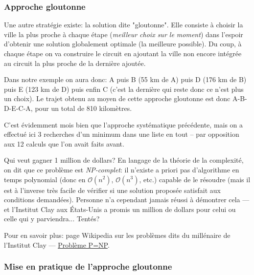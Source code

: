 \documentclass[12pt]{article}
\begin{document}
	\subsubsection*{Approche gloutonne}	
	Une autre stratégie existe: la solution dite "gloutonne". Elle consiste à choisir la ville la plus proche à chaque étape (\textit{meilleur choix sur le moment}) dans l'espoir d'obtenir une solution globalement optimale (la meilleure possible). Du coup, à chaque étape on va construire le circuit en ajoutant la ville non encore intégrée au circuit la plus proche de la dernière ajoutée.
	
	Dans notre exemple on aura donc: A puis B (55 km de A) puis D (176 km de B) puis E (123 km de D) puis enfin C (c'est la dernière qui reste donc ce n'est plus un choix). Le trajet obtenu au moyen de cette approche gloutonne est donc A-B-D-E-C-A, pour un total de 810 kilomètres.
	
	C'est évidemment mois bien que l'approche systématique précédente, mais on a effectué ici 3 recherches d'un minimum dans une liste en tout -- par opposition aux 12 calculs que l'on avait faits avant.
	
	\begin{MonCash}{Qui veut gagner 1 million de dollars?}
		En langage de la théorie de la complexité, on dit que ce problème est \textit{NP-complet}: il n'existe a priori pas d'algorithme en temps polynomial (donc en $\mathcal{O}(n^2)$, $\mathcal{O}(n^3)$, etc.) capable de le résoudre (mais il est à l'inverse très facile de vérifier si une solution proposée satisfait aux conditions demandées). Personne n'a cependant jamais réussi à  démontrer cela --- et l'Institut Clay aux États-Unis a promis un million de dollars pour celui ou celle qui y parviendra... Tentés?
		
		\vspace{\baselineskip}
		Pour en savoir plus: page Wikipedia sur les problèmes dits du millénaire de l'Institut Clay ---
		\href{https://fr.wikipedia.org/wiki/Problèmes_du_prix_du_millénaire#Problème_ouvert_P_=_NP}{Problème P=NP}.
	\end{MonCash}
	
	\subsubsection*{Mise en pratique de l'approche gloutonne}
\end{document}
